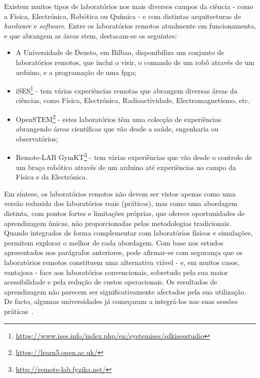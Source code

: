 Existem muitos tipos de laboratórios nos mais diversos campos da ciência - como a Física, Electrónica, Robótica ou Química - e com distintas arquitecturas de \textit{hardware} e \textit{software}. Entre os laboratórios remotos atualmente em funcionamento, e que abrangem as áreas \acrshort{stem}, destacam-se os seguintes:
\begin{itemize}
    \item A Universidade de Deusto, em Bilbao, disponibiliza um conjunto de laboratórios remotos, que inclui o \acrshort{visir}, o comando de um robô através de um \gls{arduino}, e a programação de uma \acrfull{fpga};
    \item iSES\footnote{\url{https://www.ises.info/index.php/en/systemises/sdkisesstudio}} - tem várias experiências remotas que abrangem diversas áreas da ciências, como Física, Electrónica, Radioactividade, Electromagnetismo, etc.
    \item OpenSTEM\footnote{\url{https://learn5.open.ac.uk/}} - estes laboratórios têm uma colecção de experiências abrangendo áreas científicas que vão desde a saúde, engenharia ou observatórios;
    \item Remote-LAB GymKT\footnote{\url{http://remote-lab.fyzika.net/}} - tem várias experiências que vão desde o controlo de um braço robótico através de um \gls{arduino} até experiências no campo da Física e da Electrónica.
\end{itemize}

Em síntese, os laboratórios remotos não devem ser vistos apenas como uma versão reduzida dos laboratórios reais (práticos), mas como uma abordagem distinta, com pontos fortes e limitações próprias, que oferece oportunidades de aprendizagem únicas, não proporcionadas pelas metodologias tradicionais. Quando integrados de forma complementar com laboratórios físicos e simulações, permitem explorar o melhor de cada abordagem.
Com base nos estudos apresentados nos parágrafos anteriores, pode afirmar-se com segurança que os laboratórios remotos constituem uma alternativa viável - e, em muitos casos, vantajosa - face aos laboratórios convencionais, sobretudo pela sua maior acessibilidade e pela redução de custos operacionais. Os resultados de aprendizagem não parecem ser significativamente afectados pela sua utilização. De facto, algumas universidades já começaram a integrá-los nas suas sessões práticas~\cite{VISIREngineeringPractices}.

